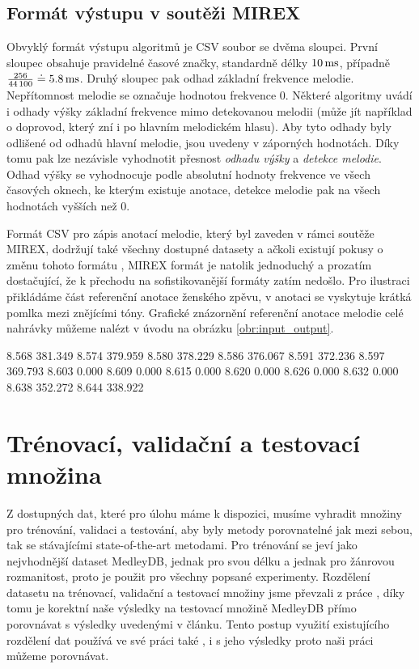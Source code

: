 \subsection{Formát výstupu v soutěži MIREX}

Obvyklý formát výstupu algoritmů je CSV soubor se dvěma sloupci. První sloupec obsahuje pravidelné časové značky, standardně délky $10\,\rm ms$, případně $\frac{256}{44\,100} \doteq 5.8 \,\rm ms$. Druhý sloupec pak odhad základní frekvence melodie. Nepřítomnost melodie se označuje hodnotou frekvence 0. Některé algoritmy uvádí i odhady výšky základní frekvence mimo detekovanou melodii (může jít například o doprovod, který zní i po hlavním melodickém hlasu). Aby tyto odhady byly odlišené od odhadů hlavní melodie, jsou uvedeny v záporných hodnotách. Díky tomu pak lze nezávisle vyhodnotit přesnost \textit{odhadu výšky} a \textit{detekce melodie}. Odhad výšky se vyhodnocuje podle absolutní hodnoty frekvence ve všech časových oknech, ke kterým existuje anotace, detekce melodie pak na všech hodnotách vyšších než 0. 

Formát CSV pro zápis anotací melodie, který byl zaveden v rámci soutěže MIREX, dodržují také všechny dostupné datasety a ačkoli existují pokusy o změnu tohoto formátu \citep{Humphrey2014a}, MIREX formát je natolik jednoduchý a prozatím dostačující, že k přechodu na sofistikovanější formáty zatím nedošlo. Pro ilustraci přikládáme část referenční anotace ženského zpěvu, v anotaci se vyskytuje krátká pomlka mezi znějícími tóny. Grafické znázornění referenční anotace melodie celé nahrávky můžeme nalézt v úvodu na obrázku \ref{obr:input_output}.

\begin{code}[xrightmargin=20em]

8.568     381.349
8.574     379.959
8.580     378.229
8.586     376.067
8.591     372.236
8.597     369.793
8.603     0.000
8.609     0.000
8.615     0.000
8.620     0.000
8.626     0.000
8.632     0.000
8.638     352.272
8.644     338.922

\end{code}


\section{Trénovací, validační a testovací množina}

Z dostupných dat, které pro úlohu máme k dispozici, musíme vyhradit množiny pro trénování, validaci a testování, aby byly metody porovnatelné jak mezi sebou, tak se stávajícími state-of-the-art metodami. Pro trénování se jeví jako nejvhodnější dataset MedleyDB, jednak pro svou délku a jednak pro žánrovou rozmanitost, proto je použit pro všechny popsané experimenty. Rozdělení datasetu na trénovací, validační a testovací množiny jsme převzali z práce \cite{Bittner2017}, díky tomu je korektní naše výsledky na testovací množině MedleyDB přímo porovnávat s výsledky uvedenými v článku. Tento postup využití existujícího rozdělení dat používá ve své práci také \cite{DBasaranSEssid2018}, i s jeho výsledky proto naši práci můžeme porovnávat.

